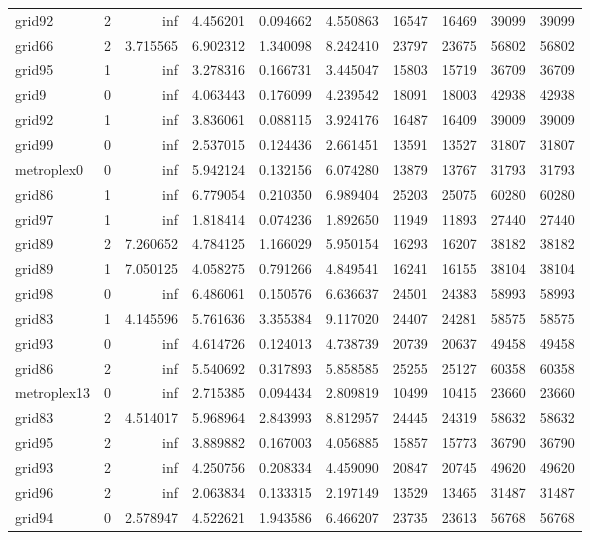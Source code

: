 \begin{longtable}{|l|r|r|r|r|r|r|r|r|r|}
grid92 & 2 & inf & 4.456201 & 0.094662 & 4.550863 & 16547 & 16469 & 39099 & 39099 \\
grid66 & 2 & 3.715565 & 6.902312 & 1.340098 & 8.242410 & 23797 & 23675 & 56802 & 56802 \\
grid95 & 1 & inf & 3.278316 & 0.166731 & 3.445047 & 15803 & 15719 & 36709 & 36709 \\
grid9 & 0 & inf & 4.063443 & 0.176099 & 4.239542 & 18091 & 18003 & 42938 & 42938 \\
grid92 & 1 & inf & 3.836061 & 0.088115 & 3.924176 & 16487 & 16409 & 39009 & 39009 \\
grid99 & 0 & inf & 2.537015 & 0.124436 & 2.661451 & 13591 & 13527 & 31807 & 31807 \\
metroplex0 & 0 & inf & 5.942124 & 0.132156 & 6.074280 & 13879 & 13767 & 31793 & 31793 \\
grid86 & 1 & inf & 6.779054 & 0.210350 & 6.989404 & 25203 & 25075 & 60280 & 60280 \\
grid97 & 1 & inf & 1.818414 & 0.074236 & 1.892650 & 11949 & 11893 & 27440 & 27440 \\
grid89 & 2 & 7.260652 & 4.784125 & 1.166029 & 5.950154 & 16293 & 16207 & 38182 & 38182 \\
grid89 & 1 & 7.050125 & 4.058275 & 0.791266 & 4.849541 & 16241 & 16155 & 38104 & 38104 \\
grid98 & 0 & inf & 6.486061 & 0.150576 & 6.636637 & 24501 & 24383 & 58993 & 58993 \\
grid83 & 1 & 4.145596 & 5.761636 & 3.355384 & 9.117020 & 24407 & 24281 & 58575 & 58575 \\
grid93 & 0 & inf & 4.614726 & 0.124013 & 4.738739 & 20739 & 20637 & 49458 & 49458 \\
grid86 & 2 & inf & 5.540692 & 0.317893 & 5.858585 & 25255 & 25127 & 60358 & 60358 \\
metroplex13 & 0 & inf & 2.715385 & 0.094434 & 2.809819 & 10499 & 10415 & 23660 & 23660 \\
grid83 & 2 & 4.514017 & 5.968964 & 2.843993 & 8.812957 & 24445 & 24319 & 58632 & 58632 \\
grid95 & 2 & inf & 3.889882 & 0.167003 & 4.056885 & 15857 & 15773 & 36790 & 36790 \\
grid93 & 2 & inf & 4.250756 & 0.208334 & 4.459090 & 20847 & 20745 & 49620 & 49620 \\
grid96 & 2 & inf & 2.063834 & 0.133315 & 2.197149 & 13529 & 13465 & 31487 & 31487 \\
grid94 & 0 & 2.578947 & 4.522621 & 1.943586 & 6.466207 & 23735 & 23613 & 56768 & 56768 \\

\end{longtable}
